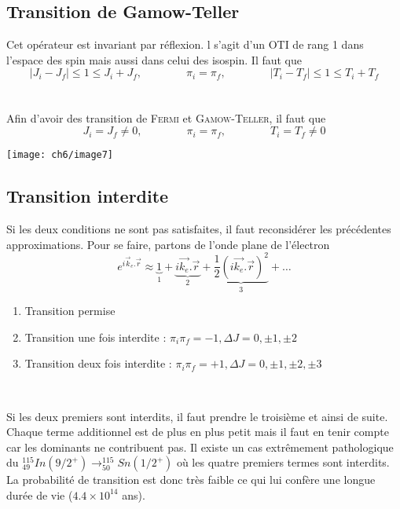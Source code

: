 \subsection{Transition de Gamow-Teller}
Cet opérateur est invariant par réflexion. l s'agit d'un OTI de rang 1 dans l'espace des spin mais aussi dans
celui des isospin. Il faut que
\begin{equation}
|J_i-J_f| \leq 1 \leq J_i+J_f,\qquad\qquad \pi_i=\pi_f, \qquad\qquad |T_i-T_f| \leq 1 \leq T_i+T_f
\end{equation}\ \\
\\
Afin d'avoir des transition de \textsc{Fermi} et \textsc{Gamow-Teller}, il faut que
\begin{equation}
J_i=J_f\neq 0,\qquad\qquad \pi_i=\pi_f,\qquad\qquad T_i=T_f\neq 0
\end{equation}

\begin{center}
	\texttt{[image: ch6/image7]}
\end{center}



\subsection{Transition interdite}
Si les deux conditions ne sont pas satisfaites, il faut reconsidérer les précédentes approximations. Pour se faire,
partons de l'onde plane de l'électron
\begin{equation}
e^{i\vec k_e.\vec r} \approx \underbrace{1}_{1}+ \underbrace{i\vec{k_e}.\vec{r}}_{2}+
\underbrace{\frac{1}{2}(i\vec{k_e}.\vec{r})^2}_{3} + \dots
\end{equation}
\begin{enumerate}
\item Transition permise
\item Transition une fois interdite : $\pi_i\pi_f=-1, \Delta J = 0,\pm1, \pm2$
\item Transition deux fois interdite : $\pi_i\pi_f=+1, \Delta J = 0,\pm1, \pm2, \pm3$
\end{enumerate}\ 

Si les deux premiers sont interdits, il faut prendre le troisième et ainsi de suite. Chaque terme additionnel est
de plus en plus petit mais il faut en tenir compte car les dominants ne contribuent pas. Il existe un cas
extrêmement pathologique du $^{115}_{49}In(9/2^+)\to ^{115}_{50}Sn(1/2^+)$ où les quatre premiers termes sont
interdits. La probabilité de transition est donc très faible ce qui lui confère une longue durée de vie
($4.4\times 10^{14}$ ans).



